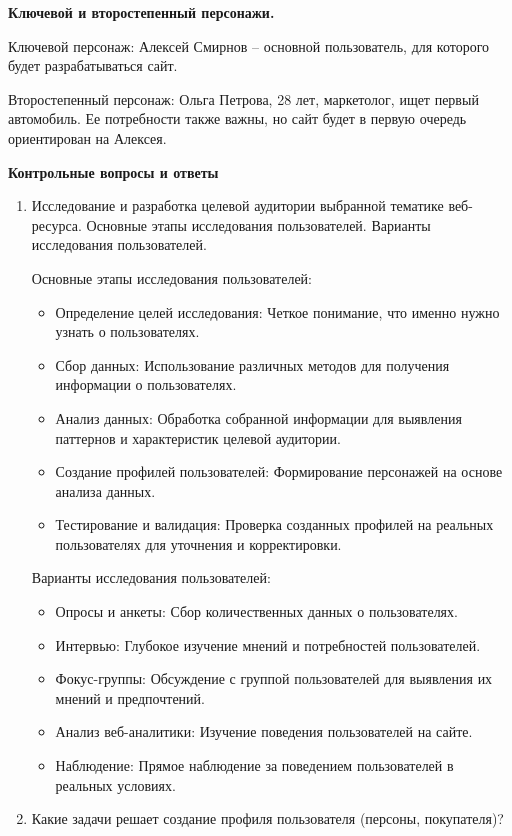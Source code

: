 \textbf{Ключевой и второстепенный персонажи.}

Ключевой персонаж: Алексей Смирнов – основной пользователь, для которого будет разрабатываться сайт.

Второстепенный персонаж: Ольга Петрова, 28 лет, маркетолог, ищет первый автомобиль. Ее потребности также важны, но сайт будет в первую очередь ориентирован на Алексея.
\bigskip

\textbf{Контрольные вопросы и ответы}

\begin{enumerate}
\item Исследование и разработка целевой аудитории выбранной тематике веб-ресурса. Основные этапы исследования пользователей. Варианты исследования пользователей.
    \bigskip

Основные этапы исследования пользователей:

        \begin{itemize}
            \item Определение целей исследования: Четкое понимание, что именно нужно узнать о пользователях.
            \item Сбор данных: Использование различных методов для получения информации о пользователях.
            \item Анализ данных: Обработка собранной информации для выявления паттернов и характеристик целевой аудитории.
            \item Создание профилей пользователей: Формирование персонажей на основе анализа данных.
            \item Тестирование и валидация: Проверка созданных профилей на реальных пользователях для уточнения и корректировки.
        \end{itemize}
    \bigskip

Варианты исследования пользователей:

        \begin{itemize}
            \item Опросы и анкеты: Сбор количественных данных о пользователях.
            \item Интервью: Глубокое изучение мнений и потребностей пользователей.
            \item Фокус-группы: Обсуждение с группой пользователей для выявления их мнений и предпочтений.
            \item Анализ веб-аналитики: Изучение поведения пользователей на сайте.
            \item Наблюдение: Прямое наблюдение за поведением пользователей в реальных условиях.
        \end{itemize}
\item Какие задачи решает создание профиля пользователя (персоны, покупателя)?


\end{enumerate}
